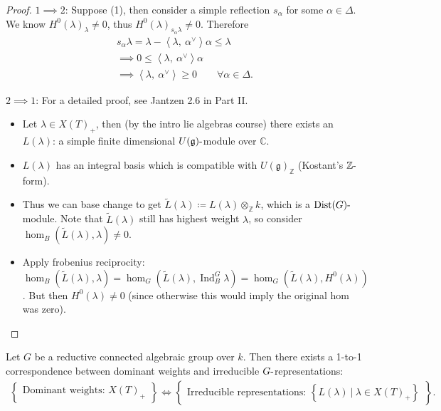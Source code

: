 \begin{proof}

\(1\implies 2\): Suppose (1), then consider a simple reflection
\(s_\alpha\) for some \(\alpha \in \Delta\). We know
\(H^0(\lambda)_\lambda \neq 0\), thus
\(H^0(\lambda)_{s_\alpha \lambda} \neq 0\). Therefore
\begin{align*}  
s_\alpha \lambda = \lambda - {\left\langle {\lambda},~{\alpha^\vee} \right\rangle}\alpha \leq \lambda \\
\implies 0 \leq {\left\langle {\lambda},~{\alpha^\vee} \right\rangle}\alpha \\
\implies {\left\langle {\lambda},~{\alpha^\vee} \right\rangle} \geq 0 \qquad \forall \alpha\in \Delta
.\end{align*}

\(2\implies 1\): For a detailed proof, see Jantzen 2.6 in Part II.

\begin{itemize}
\item
  Let \(\lambda \in X(T)_+\), then (by the intro lie algebras course)
  there exists an \(L(\lambda)\): a simple finite dimensional
  \(U({\mathfrak{g}}){\hbox{-}}\)module over \({\mathbb{C}}\).
\item
  \(L(\lambda)\) has an integral basis which is compatible with
  \(U({\mathfrak{g}})_{\mathbb{Z}}\) (Kostant's
  \({\mathbb{Z}}{\hbox{-}}\)form).
\item
  Thus we can base change to get
  \(\tilde L(\lambda) \coloneqq L(\lambda) \otimes_{\mathbb{Z}}k\),
  which is a \(\mathrm{Dist}(G){\hbox{-}}\)module. Note that
  \(\tilde L(\lambda)\) still has highest weight \(\lambda\), so
  consider \(\hom_B(\tilde L(\lambda), \lambda) \neq 0\).
\item
  Apply frobenius reciprocity:
  \(\hom_B(\tilde L(\lambda), \lambda) = \hom_G(\tilde L(\lambda), \operatorname{Ind}_B^G \lambda) = \hom_G(\tilde L(\lambda), H^0(\lambda))\).
  But then \(H^0(\lambda) \neq 0\) (since otherwise this would imply the
  original hom was zero).
\end{itemize}

\end{proof}

\begin{theorem}[?]

Let \(G\) be a reductive connected algebraic group over \(k\). Then
there exists a 1-to-1 correspondence between dominant weights and
irreducible \(G{\hbox{-}}\)representations:
\begin{align*}  
\left\{{\substack{\text{Dominant weights: } X(T)_+}}\right\} \iff
\left\{{\substack{\text{Irreducible representations: }\left\{{L(\lambda) {~\mathrel{\Big|}~}\lambda \in X(T)_+}\right\} }}\right\}
.\end{align*}

\end{theorem}

